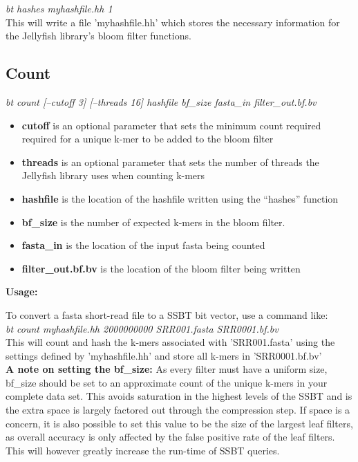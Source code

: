 \documentclass{article}
\begin{document}
\textit{bt hashes myhashfile.hh 1} \\

This will write a file 'myhashfile.hh' which stores the necessary information for the Jellyfish library's bloom filter functions.

\subsection{Count}
\textit{bt count [--cutoff 3] [--threads 16] hashfile bf\_size fasta\_in filter\_out.bf.bv}
\begin{itemize}
\item \textbf{cutoff} is an optional parameter that sets the minimum count required required for a unique k-mer to be added to the bloom filter
\item \textbf{threads} is an optional parameter that sets the number of threads the Jellyfish library uses when counting k-mers
\item \textbf{hashfile} is the location of the hashfile written using the ``hashes'' function
\item \textbf{bf\_size} is the number of expected k-mers in the bloom filter. 
\item \textbf{fasta\_in} is the location of the input fasta being counted
\item \textbf{filter\_out.bf.bv} is the location of the bloom filter being written
\end{itemize}
\textbf{Usage:}

To convert a fasta short-read file to a SSBT bit vector, use a command like: \\

\textit{bt count myhashfile.hh 2000000000 SRR001.fasta SRR0001.bf.bv} \\

This will count and hash the k-mers associated with 'SRR001.fasta' using the settings defined by 'myhashfile.hh' and store all k-mers in 'SRR0001.bf.bv' \\

\textbf{A note on setting the bf\_size:}
As every filter must have a uniform size, bf\_size should be set to an approximate count of the unique k-mers in your complete data set. This avoids saturation in the highest levels of the SSBT and is the extra space is largely factored out through the compression step. If space is a concern, it is also possible to set this value to be the size of the largest leaf filters, as overall accuracy is only affected by the false positive rate of the leaf filters. This will however greatly increase the run-time of SSBT queries. 
\end{document}
